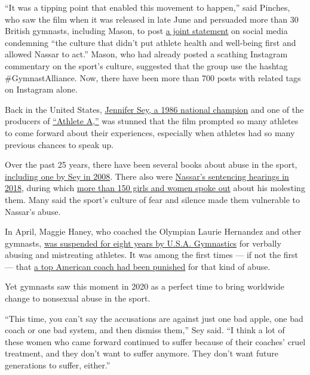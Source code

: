 ``It was a tipping point that enabled this movement to happen,'' said
Pinches, who saw the film when it was released in late June and
persuaded more than 30 British gymnasts, including Mason, to post
\href{https://www.instagram.com/p/CCBs9R1DPFh/}{a joint statement} on
social media condemning ``the culture that didn't put athlete health and
well-being first and allowed Nassar to act.'' Mason, who had already
posted a scathing Instagram commentary on the sport's culture, suggested
that the group use the hashtag \#GymnastAlliance. Now, there have been
more than 700 posts with related tags on Instagram alone.

Back in the United States,
\href{https://www.nytimes3xbfgragh.onion/2017/03/30/opinion/sunday/how-gymnastics-culture-breeds-sexual-abuse.html}{Jennifer
Sey, a 1986 national champion} and one of the producers of
\href{https://www.rogerebert.com/reviews/athlete-a-movie-review-2020}{``Athlete
A,''} was stunned that the film prompted so many athletes to come
forward about their experiences, especially when athletes had so many
previous chances to speak up.

Over the past 25 years, there have been several books about abuse in the
sport,
\href{https://www.npr.org/templates/story/story.php?storyId=90105904}{including
one by Sey in 2008}. There also were
\href{https://www.nytimes3xbfgragh.onion/video/sports/100000005686677/gymnasts-confront-larry-nassar-over-sexual-abuse.html?searchResultPosition=8}{Nassar's
sentencing hearings in 2018}, during which
\href{https://www.nytimes3xbfgragh.onion/2018/01/24/sports/rachael-denhollander-nassar-gymnastics.html?searchResultPosition=28}{more
than 150 girls and women spoke out} about his molesting them. Many said
the sport's culture of fear and silence made them vulnerable to Nassar's
abuse.

In April, Maggie Haney, who coached the Olympian Laurie Hernandez and
other gymnasts,
\href{https://www.nytimes3xbfgragh.onion/2020/05/01/sports/maggie-haney-gymnastics-abuse.html}{was
suspended for eight years by U.S.A. Gymnastics} for verbally abusing and
mistreating athletes. It was among the first times --- if not the first
--- that
\href{https://www.nytimes3xbfgragh.onion/2020/04/29/sports/gymnastics-coach-banned-maggie-haney.html}{a
top American coach had been punished} for that kind of abuse.

Yet gymnasts saw this moment in 2020 as a perfect time to bring
worldwide change to nonsexual abuse in the sport.

``This time, you can't say the accusations are against just one bad
apple, one bad coach or one bad system, and then dismiss them,'' Sey
said. ``I think a lot of these women who came forward continued to
suffer because of their coaches' cruel treatment, and they don't want to
suffer anymore. They don't want future generations to suffer, either.''

